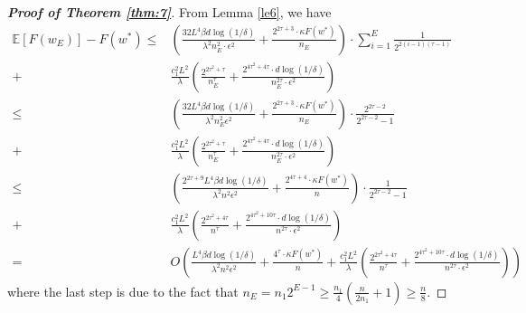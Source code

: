 \documentclass[12pt]{alt2022} %
\begin{document}
\begin{proof}[{\bf Proof of Theorem \ref{thm:7}}]
From Lemma \ref{le6}, we have 
\begin{equation*}
\begin{aligned}
\mathbb{E}[F(w_E)]-F(w^*)\leq &\left(\frac{32L^4 \beta d\log(1/\delta)}{\lambda^2 n_E^2\cdot\epsilon^2}+\frac{2^{2\tau+3}\cdot \kappa  F(w^{*})}{n_E}\right) \cdot \sum\limits_{i=1}^{E}\frac{1}{2^{2(i-1)(\tau -1)}}\\
+&\frac{c_1^2 L^2}{\lambda}\left(\frac{2^{2\tau^2+\tau}}{n_E^{\tau}}+\frac{2^{4\tau^2+4\tau  }\cdot d\log(1/\delta)}{n_E^{2\tau}\cdot \epsilon^2}\right)
\\\leq &\left(\frac{32L^4 \beta d\log(1/\delta)}{\lambda^2 n_E^2\epsilon^2}+\frac{2^{2\tau+3}\cdot \kappa  F(w^{*})}{n_E}\right) \cdot \frac{2^{2\tau-2}}{2^{2\tau-2}-1}\\
+&\frac{c_1^2 L^2}{\lambda}\left(\frac{2^{2\tau^2+\tau}}{n_E^{\tau}}+\frac{2^{4\tau^2+4\tau  }\cdot d\log(1/\delta)}{n_E^{2\tau}\cdot \epsilon^2}\right)
\\\leq &\left(\frac{2^{2\tau +9}L^4 \beta d\log(1/\delta)}{\lambda^2 n^2\epsilon^2}+\frac{2^{4\tau+4}\cdot \kappa  F(w^{*})}{n}\right) \cdot \frac{1}{2^{2\tau-2}-1}\\
+&\frac{c_1^2 L^2}{\lambda}\left(\frac{2^{2\tau^2+4\tau}}{n^{\tau}}+\frac{2^{4\tau^2+10\tau  }\cdot d\log(1/\delta)}{n^{2\tau}\cdot \epsilon^2}\right)
\\=&O\left( \frac{L^4 \beta d\log(1/\delta)}{\lambda^2 n^2\epsilon^2}+\frac{4^{\tau}\cdot \kappa  F(w^{*})}{n} +\frac{c_1^2 L^2}{\lambda}\left(\frac{2^{2\tau^2+4\tau}}{n^{\tau}}+\frac{2^{4\tau^2+10\tau  }\cdot d\log(1/\delta)}{n^{2\tau}\cdot \epsilon^2}\right)  \right)
\end{aligned}
\end{equation*}
where the last step is due to the fact that 
$n_{E}=n_1 2^{E-1}\geq \frac{n_1}{4}(\frac{n}{2n_1}+1)\geq \frac{n}{8}$.
\end{proof}
\end{document}
